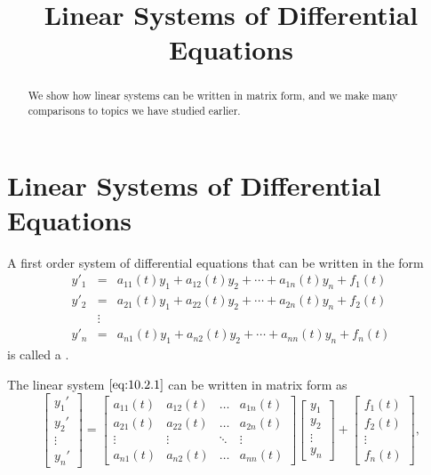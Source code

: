\documentclass{ximera}
\title{Linear Systems of Differential Equations}%
\begin{document}
\begin{abstract}
We show how linear systems can be written in matrix form, and we make many comparisons to topics we have studied earlier.
\end{abstract}

\maketitle

\section*{Linear Systems of Differential Equations}

A  first order system of  differential equations that can be written in
the form
\begin{equation} \label{eq:10.2.1}
\begin{array}{ccl}
y'_1&=&a_{11}(t)y_1+a_{12}(t)y_2+\cdots+a_{1n}(t)y_n+f_1(t)\\
y'_2&=&a_{21}(t)y_1+a_{22}(t)y_2+\cdots+a_{2n}(t)y_n+f_2(t)\\
&\vdots\\
y'_n&
=&a_{n1}(t)y_1+a_{n2}(t)y_2+\cdots+a_{nn}(t)y_n+f_n(t)\end{array}
\end{equation}
is called a .

The linear system $\eqref{eq:10.2.1}$  can be written in matrix form as
$$
\begin{bmatrix}y_1'\\y_2'\\\vdots\\y_n'\end{bmatrix}=\begin{bmatrix}a_{11}(t)&a_{12}(t)&\dots &a_{1n}(t)\\
a_{21}(t)&a_{22}(t)&\dots &a_{2n}(t)\\
\vdots &\vdots &\ddots &\vdots\\
a_{n1}(t)&a_{n2}(t)&\dots &a_{nn}(t)\end{bmatrix}\begin{bmatrix}y_1\\y_2\\\vdots\\y_n\end{bmatrix}+\begin{bmatrix}f_1(t)\\f_2(t)\\\vdots\\f_n(t)\end{bmatrix},
$$
\end{document}
